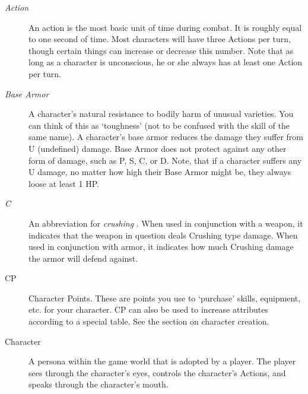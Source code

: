 \documentclass[twoside]{book}
\begin{document}
\begin{description}
    
  \item[
                \emph{ Action }
              ] 
    {  
     An action is the most basic unit of time during
                 combat. It is roughly equal to one second of time. Most
                 characters will have three Actions per turn, though
                 certain things can increase or decrease this number.
                 Note that as long as a character is unconscious, he or
                 she always has at least one Action per turn. 
    }
  
  \item[
                \emph{ Base Armor }
              ] 
    {  
      A character's natural resistance to bodily
                 harm of unusual varieties. You can think of this as
                 `toughness' (not to be confused with the
                 skill of the same name). A character's base armor
                 reduces the damage they suffer from U (undefined)
                 damage. Base Armor does not protect against any other
                 form of damage, such as P, S, C, or D. Note, that if a
                 character suffers any U damage, no matter how high their
                 Base Armor might be, they always loose at least 1 HP.
                 
    }
  
  \item[
                \emph{ C }
              ] 
    {  
      An abbreviation for 
                 \emph{ crushing } . When used in conjunction
                  with a weapon, it indicates that the weapon in question
                  deals Crushing type damage. When used in conjunction
                  with armor, it indicates how much Crushing damage the
                  armor will defend against.
              
    }
  
  \item[ CP ] 
    {  
      Character Points. These are points you use to
                 `purchase' skills, equipment, etc. for your
                 character. CP can also be used to increase attributes
                 according to a special table. See the section on
                 character creation. 
    }
  
  \item[ Character ] 
    {  
      A persona within the game world that is adopted
                 by a player. The player sees through the
                 character's eyes, controls the character's
                 Actions, and speaks through the character's mouth.
                 
}
\end{description}
\end{document}
